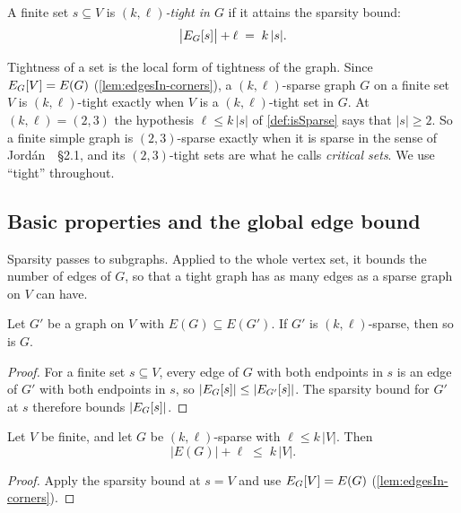 \begin{definition}
  \label{def:isTightOn}
  \leanok
  A finite set $s \subseteq V$ is \emph{$(k,\ell)$-tight in $G$} if it
  attains the sparsity bound:
  \[
    \bigl|\edgesIn{s}\bigr| + \ell \;=\; k\,|s|.
  \]
\end{definition}

Tightness of a set is the local form of tightness of the graph. Since
$\edgesIn{V} = E(G)$ (\cref{lem:edgesIn-corners}), a $(k,\ell)$-sparse
graph $G$ on a finite set $V$ is $(k,\ell)$-tight exactly when $V$ is a
$(k,\ell)$-tight set in $G$. At $(k,\ell) = (2,3)$ the hypothesis
$\ell \le k\,|s|$ of \cref{def:isSparse} says that $|s| \ge 2$. So a
finite simple graph is $(2,3)$-sparse exactly when it is sparse in the
sense of Jord\'an~\cite{jordan2016}~\S 2.1, and its $(2,3)$-tight sets
are what he calls \emph{critical sets}. We use ``tight'' throughout.

\subsection{Basic properties and the global edge bound}

Sparsity passes to subgraphs. Applied to the whole vertex set, it
bounds the number of edges of $G$, so that a tight graph has as many
edges as a sparse graph on $V$ can have.

\begin{lemma}
  \label{lem:isSparse-mono-left}
  \leanok
  Let $G'$ be a graph on $V$ with $E(G) \subseteq E(G')$. If $G'$ is
  $(k,\ell)$-sparse, then so is $G$.
\end{lemma}
\begin{proof}
  \leanok
  For a finite set $s \subseteq V$, every edge of $G$ with both
  endpoints in $s$ is an edge of $G'$ with both endpoints in $s$, so
  $|\edgesIn[G]{s}| \le |\edgesIn[G']{s}|$. The sparsity bound for
  $G'$ at $s$ therefore bounds $|\edgesIn[G]{s}|$.
\end{proof}

\begin{lemma}
  \label{lem:isSparse-edgeSet-bound}
  \leanok
  Let $V$ be finite, and let $G$ be $(k,\ell)$-sparse with
  $\ell \le k\,|V|$. Then
  \[
    |E(G)| + \ell \;\le\; k\,|V|.
  \]
\end{lemma}
\begin{proof}
  \leanok
  Apply the sparsity bound at $s = V$ and use $\edgesIn{V} = E(G)$
  (\cref{lem:edgesIn-corners}).
\end{proof}

